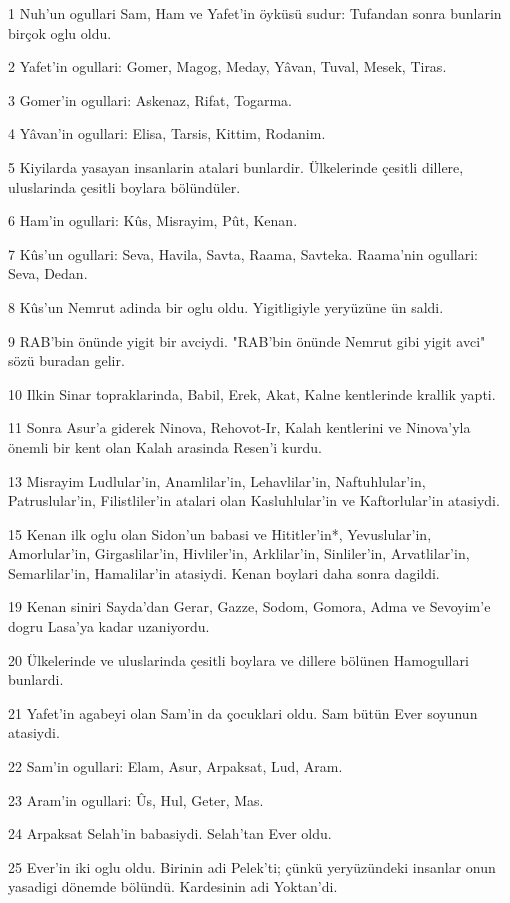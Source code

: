 \par 1 Nuh'un ogullari Sam, Ham ve Yafet'in öyküsü sudur: Tufandan sonra bunlarin birçok oglu oldu.
\par 2 Yafet'in ogullari: Gomer, Magog, Meday, Yâvan, Tuval, Mesek, Tiras.
\par 3 Gomer'in ogullari: Askenaz, Rifat, Togarma.
\par 4 Yâvan'in ogullari: Elisa, Tarsis, Kittim, Rodanim.
\par 5 Kiyilarda yasayan insanlarin atalari bunlardir. Ülkelerinde çesitli dillere, uluslarinda çesitli boylara bölündüler.
\par 6 Ham'in ogullari: Kûs, Misrayim, Pût, Kenan.
\par 7 Kûs'un ogullari: Seva, Havila, Savta, Raama, Savteka. Raama'nin ogullari: Seva, Dedan.
\par 8 Kûs'un Nemrut adinda bir oglu oldu. Yigitligiyle yeryüzüne ün saldi.
\par 9 RAB'bin önünde yigit bir avciydi. "RAB'bin önünde Nemrut gibi yigit avci" sözü buradan gelir.
\par 10 Ilkin Sinar topraklarinda, Babil, Erek, Akat, Kalne kentlerinde krallik yapti.
\par 11 Sonra Asur'a giderek Ninova, Rehovot-Ir, Kalah kentlerini ve Ninova'yla önemli bir kent olan Kalah arasinda Resen'i kurdu.
\par 13 Misrayim Ludlular'in, Anamlilar'in, Lehavlilar'in, Naftuhlular'in, Patruslular'in, Filistliler'in atalari olan Kasluhlular'in ve Kaftorlular'in atasiydi.
\par 15 Kenan ilk oglu olan Sidon'un babasi ve Hititler'in*, Yevuslular'in, Amorlular'in, Girgaslilar'in, Hivliler'in, Arklilar'in, Sinliler'in, Arvatlilar'in, Semarlilar'in, Hamalilar'in atasiydi. Kenan boylari daha sonra dagildi.
\par 19 Kenan siniri Sayda'dan Gerar, Gazze, Sodom, Gomora, Adma ve Sevoyim'e dogru Lasa'ya kadar uzaniyordu.
\par 20 Ülkelerinde ve uluslarinda çesitli boylara ve dillere bölünen Hamogullari bunlardi.
\par 21 Yafet'in agabeyi olan Sam'in da çocuklari oldu. Sam bütün Ever soyunun atasiydi.
\par 22 Sam'in ogullari: Elam, Asur, Arpaksat, Lud, Aram.
\par 23 Aram'in ogullari: Ûs, Hul, Geter, Mas.
\par 24 Arpaksat Selah'in babasiydi. Selah'tan Ever oldu.
\par 25 Ever'in iki oglu oldu. Birinin adi Pelek'ti; çünkü yeryüzündeki insanlar onun yasadigi dönemde bölündü. Kardesinin adi Yoktan'di.

